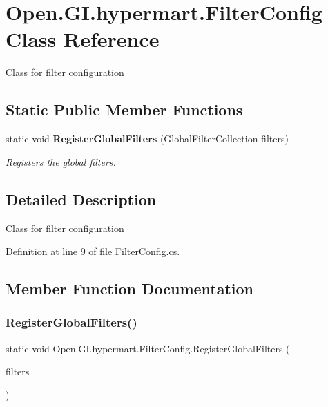 \section{Open.\+G\+I.\+hypermart.\+Filter\+Config Class Reference}
\label{class_open_1_1_g_i_1_1hypermart_1_1_filter_config}


Class for filter configuration  


\subsection*{Static Public Member Functions}
\begin{DoxyCompactItemize}
\item 
static void \textbf{ Register\+Global\+Filters} (Global\+Filter\+Collection filters)
\begin{DoxyCompactList}\small\item\em Registers the global filters. \end{DoxyCompactList}\end{DoxyCompactItemize}


\subsection{Detailed Description}
Class for filter configuration 



Definition at line 9 of file Filter\+Config.\+cs.



\subsection{Member Function Documentation}
\mbox{\label{class_open_1_1_g_i_1_1hypermart_1_1_filter_config_a7c2f9e6d0e8157c2942a400ccff8134b}} 
\subsubsection{Register\+Global\+Filters()}
{\footnotesize\ttfamily static void Open.\+G\+I.\+hypermart.\+Filter\+Config.\+Register\+Global\+Filters (\begin{DoxyParamCaption}\item[{Global\+Filter\+Collection}]{filters }\end{DoxyParamCaption})\hspace{0.3cm}{\ttfamily [static]}}



